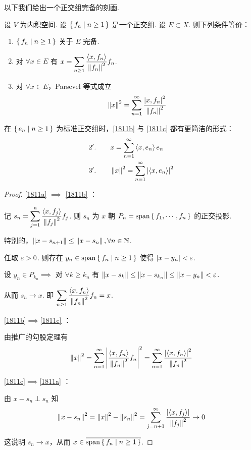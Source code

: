 以下我们给出一个正交组完备的刻画.

\begin{theorem}
    设 $V$ 为内积空间. 设 $\set{f_n|n\ge 1}$ 是一个正交组. 设 $E\subset X$. 则下列条件等价：

    \begin{enumerate}
        \item\label{1811a} $\set{f_n|n\ge 1}$ 关于 $E$ 完备.
        
        \item\label{1811b} 对 $\forall x\in E$ 有 $x=\displaystyle\sum_{n\ge 1}\frac{\left\langle{x,f_n}\right\rangle}{\left\lVert{f_n}\right\rVert^2}f_n$.
        
        \item\label{1811c} 对 $\forall x\in E$，Parsevel 等式成立
$$
\left\lVert{x}\right\rVert^2=\sum_{n=1}^\infty\frac{\left\lvert{x,f_n}\right\rvert^2}{\left\lVert{f_n}\right\rVert^2}
$$
    \end{enumerate}
\end{theorem}

\begin{hint}
    在 $\set{e_n|n\ge 1}$ 为标准正交组时，\ref{1811b} 与 \ref{1811c} 都有更简洁的形式：
$$
\begin{aligned}
    2'. \qquad & x=\sum_{n=1}^\infty\left\langle{x,e_n}\right\rangle e_n\\
    3'. \qquad & \left\lVert{x}\right\rVert^2=\sum_{n=1}^\infty\left\lvert{\left\langle{x,e_n}\right\rangle}\right\rvert^2
\end{aligned}
$$
\end{hint}

\begin{proof}
    \ref{1811a} $\implies$ \ref{1811b} ：

    记 $s_n=\displaystyle\sum_{j=1}^n\frac{\left\langle{x,f_j}\right\rangle}{\left\lVert{f_j}\right\rVert^2}f_j$. 则 $s_n$ 为 $x$ 朝 $P_n=\mathrm{span}\set{f_1,\cdots,f_n}$ 的正交投影.

    特别的，$\left\lVert{x-s_{n+1}}\right\rVert\le\left\lVert{x-s_n}\right\rVert,\forall n\in\mathbb{N}$.

    任取 $\varepsilon>0$. 则存在 $y_n\in\mathrm{span}\set{f_n|n\ge 1}$ 使得 $\left\lvert{x-y_n}\right\rvert<\varepsilon$.

    设 $y_n\in P_{k_n}\implies$ 对 $\forall k\ge k_n$ 有 $\left\lVert{x-s_k}\right\rVert\le\left\lVert{x-s_{k_n}}\right\rVert\le\left\lVert{x-y_n}\right\rVert<\varepsilon$.

    从而 $s_n\to x$. 即 $\displaystyle\sum_{n\ge 1}\frac{\left\langle{x,f_n}\right\rangle}{\left\lVert{f_n}\right\rVert^2}f_n=x$.

    \ref{1811b}$\implies$\ref{1811c} ：

    由推广的勾股定理有
$$
\left\lVert{x}\right\rVert^2=\sum_{n=1}^\infty\left\lvert{\frac{\left\langle{x,f_n}\right\rangle}{\left\lVert{f_n}\right\rVert^2}f_n}\right\rvert^2=\sum_{n=1}^\infty\frac{\left\lvert{\left\langle{x,f_n}\right\rangle}\right\rvert^2}{\left\lVert{f_n}\right\rVert^2}
$$

    \ref{1811c}$\implies$\ref{1811a} ：

    由 $x-s_n\perp s_n$ 知
$$
\left\lVert{x-s_n}\right\rVert^2=\left\lVert{x}\right\rVert^2-\left\lVert{s_n}\right\rVert^2=\sum_{j=n+1}^\infty\frac{\left\lvert{\left\langle{x,f_j}\right\rangle}\right\rvert}{\left\lVert{f_j}\right\rVert^2}\to 0
$$

    这说明 $s_n\to x$，从而 $x\in\overline{\mathrm{span}\set{f_n|n\ge 1}}$.
\end{proof}


